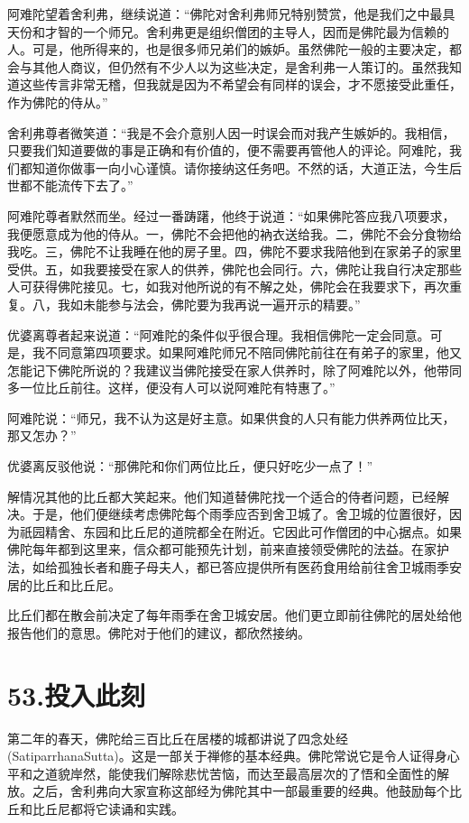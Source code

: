 \documentclass[12pt,twoside,openany]{book}
\begin{document}
阿难陀望着舍利弗，继续说道：“佛陀对舍利弗师兄特别赞赏，他是我们之中最具天份和才智的一个师兄。舍利弗更是组织僧团的主导人，因而是佛陀最为信赖的人。可是，他所得来的，也是很多师兄弟们的嫉妒。虽然佛陀一般的主要决定，都会与其他人商议，但仍然有不少人以为这些决定，是舍利弗一人策订的。虽然我知道这些传言非常无稽，但我就是因为不希望会有同样的误会，才不愿接受此重任，作为佛陀的侍从。”

舍利弗尊者微笑道：“我是不会介意别人因一时误会而对我产生嫉妒的。我相信，只要我们知道要做的事是正确和有价值的，便不需要再管他人的评论。阿难陀，我们都知道你做事一向小心谨慎。请你接纳这任务吧。不然的话，大道正法，今生后世都不能流传下去了。”

阿难陀尊者默然而坐。经过一番踌躇，他终于说道：“如果佛陀答应我八项要求，我便愿意成为他的侍从。一，佛陀不会把他的衲衣送给我。二，佛陀不会分食物给我吃。三，佛陀不让我睡在他的房子里。四，佛陀不要求我陪他到在家弟子的家里受供。五，如我要接受在家人的供养，佛陀也会同行。六，佛陀让我自行决定那些人可获得佛陀接见。七，如我对他所说的有不解之处，佛陀会在我要求下，再次重复。八，我如未能参与法会，佛陀要为我再说一遍开示的精要。”

优婆离尊者起来说道：“阿难陀的条件似乎很合理。我相信佛陀一定会同意。可是，我不同意第四项要求。如果阿难陀师兄不陪同佛陀前往在有弟子的家里，他又怎能记下佛陀所说的？我建议当佛陀接受在家人供养时，除了阿难陀以外，他带同多一位比丘前往。这样，便没有人可以说阿难陀有特惠了。”

阿难陀说：“师兄，我不认为这是好主意。如果供食的人只有能力供养两位比天，那又怎办？”

优婆离反驳他说：“那佛陀和你们两位比丘，便只好吃少一点了！”

解情况其他的比丘都大笑起来。他们知道替佛陀找一个适合的侍者问题，已经解决。于是，他们便继续考虑佛陀每个雨季应否到舍卫城了。舍卫城的位置很好，因为祇园精舍、东园和比丘尼的道院都全在附近。它因此可作僧团的中心据点。如果佛陀每年都到这里来，信众都可能预先计划，前来直接领受佛陀的法益。在家护法，如给孤独长者和鹿子母夫人，都已答应提供所有医药食用给前往舍卫城雨季安居的比丘和比丘尼。

比丘们都在散会前决定了每年雨季在舍卫城安居。他们更立即前往佛陀的居处给他报告他们的意思。佛陀对于他们的建议，都欣然接纳。


\chapter{53.投入此刻}\label{ch53}

第二年的春天，佛陀给三百比丘在居楼的城都讲说了四念处经(SatiparrhanaSutta)。这是一部关于禅修的基本经典。佛陀常说它是令人证得身心平和之道貌岸然，能使我们解除悲忧苦恼，而达至最高层次的了悟和全面性的解放。之后，舍利弗向大家宣称这部经为佛陀其中一部最重要的经典。他鼓励每个比丘和比丘尼都将它读诵和实践。
\end{document}
